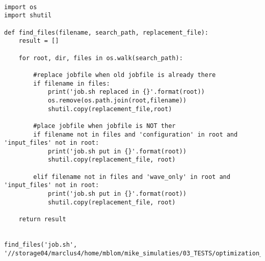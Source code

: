 \begin{mdframed}[backgroundcolor=light-gray, roundcorner=10pt,leftmargin=1, rightmargin=1, innerleftmargin=0, innertopmargin=7,innerbottommargin=0, outerlinewidth=1, linecolor=light-gray]
\begin{lstlisting}[linewidth=\columnwidth,caption=Script to put job.sh file in all directories ., label=script: job file in directory]

import os
import shutil

def find_files(filename, search_path, replacement_file):
    result = []

    for root, dir, files in os.walk(search_path):

        #replace jobfile when old jobfile is already there
        if filename in files:
            print('job.sh replaced in {}'.format(root))
            os.remove(os.path.join(root,filename))
            shutil.copy(replacement_file,root)

        #place jobfile when jobfile is NOT ther
        if filename not in files and 'configuration' in root and 'input_files' not in root:
            print('job.sh put in {}'.format(root))
            shutil.copy(replacement_file, root)

        elif filename not in files and 'wave_only' in root and 'input_files' not in root:
            print('job.sh put in {}'.format(root))
            shutil.copy(replacement_file, root)

    return result


find_files('job.sh',  '//storage04/marclus4/home/mblom/mike_simulaties/03_TESTS/optimization_clusterfolder/ComFLOW_simulations','../input_files/job.sh')
    
\end{lstlisting}
\end{mdframed}

